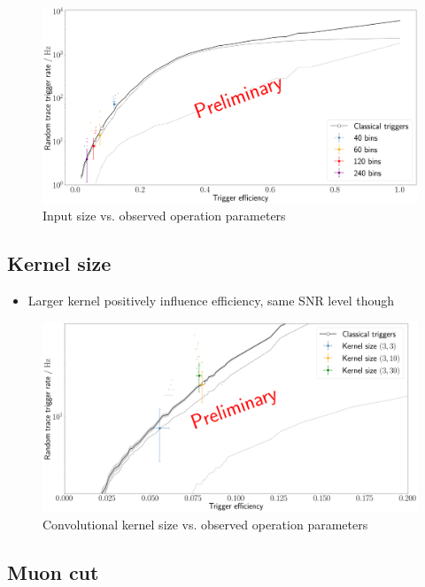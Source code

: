 \begin{figure}
	\centering
	\includegraphics[width=1\textwidth]{./plots/prelim/input_size.png}
	\caption{Input size vs. observed operation parameters}
\end{figure}

\subsection{Kernel size}
\label{ssec:kernel-size}

\begin{itemize}
	\item Larger kernel positively influence efficiency, same SNR level though
\end{itemize}

\begin{figure}
	\centering
	\includegraphics[width=1\textwidth]{./plots/prelim/kernel_size.png}
	\caption{Convolutional kernel size vs. observed operation parameters}
\end{figure}

\subsection{Muon cut}
\label{ssec:cnn-muon-cut}

